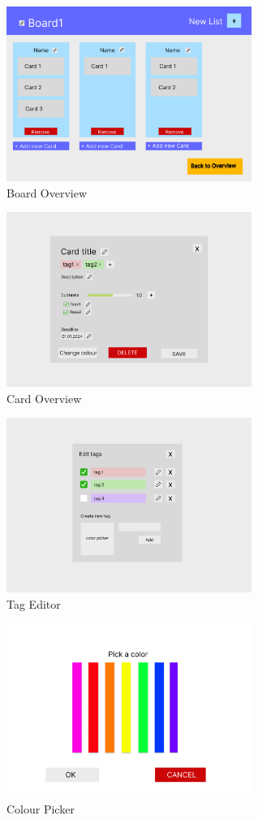 \begin{figure}
    \caption{Board Overview}
    \includegraphics[width=8cm]{content/scenes/Board Overview.png}
\end{figure}

\begin{figure}
    \caption{Card Overview}
    \includegraphics[width=8cm]{content/scenes/Card Overview (Editing).png}
\end{figure}



\begin{figure}
    \caption{Tag Editor}
    \includegraphics[width=8cm]{content/scenes/Edit tags.png} 
\end{figure}

\begin{figure}
    \caption{Colour Picker}
\includegraphics[width=8cm]{content/scenes/Change Colour.png}
\end{figure}

